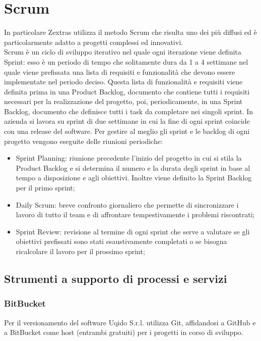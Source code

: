 \section{Scrum}
In particolare Zextras utilizza il metodo Scrum che risulta uno dei più diffusi ed è particolarmente adatto a progetti complessi ed innovativi.\\
Scrum è un ciclo di sviluppo iterativo nel quale ogni iterazione viene definita Sprint: esso è un periodo di tempo che solitamente dura da 1 a 4 settimane nel quale viene prefissata una  lista di requisiti e funzionalità che devono essere implementate nel periodo deciso.
Questa lista di funzionalità e requisiti viene definita prima in una Product Backlog, documento che contiene tutti i requisiti necessari per la realizzazione del progetto, poi, periodicamente, in una Sprint Backlog, documento che definisce tutti i task da completare nei singoli sprint. 
In azienda si lavora su sprint di due settimane in cui la fine di ogni sprint coincide con una release del software.
Per gestire al meglio gli sprint e le backlog di ogni progetto vengono eseguite delle riunioni periodiche:
\begin{itemize}
	\item Sprint Planning: riunione precedente l'inizio del progetto in cui si stila la Product Backlog e si determina il numero e la durata degli sprint in base al tempo a disposizione e agli obiettivi. Inoltre viene definito la Sprint Backlog per il primo sprint;
	\item Daily Scrum: breve confronto giornaliero che permette di sincronizzare i lavoro di tutto il team e di affrontare tempestivamente i problemi riscontrati;
	\item Sprint Review: revisione al termine di ogni sprint che serve a valutare se gli obiettivi prefissati sono stati esaustivamente completati o se bisogna ricalcolare il lavoro per il prossimo sprint;
\end{itemize}



\subsection{Strumenti a supporto di processi e servizi}
\subsubsection{BitBucket}
Per il versionamento del software Uqido S.r.l. utilizza Git, affidandosi a GitHub
e a BitBucket come host (entrambi gratuiti) per i progetti in corso
di sviluppo.
